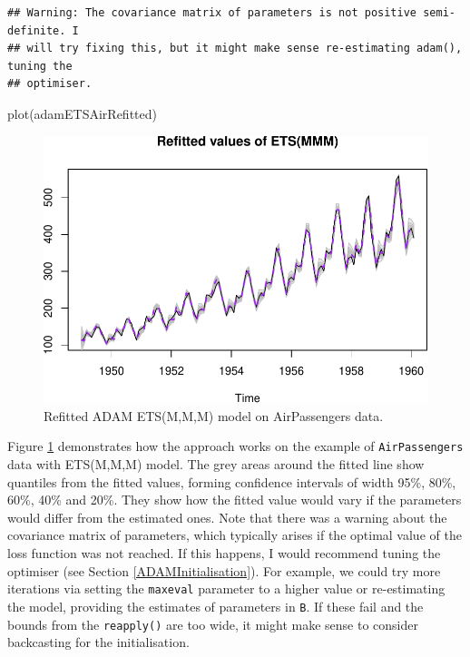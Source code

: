 \documentclass[
]{book}
\newenvironment{Shaded}{\begin{snugshade}}{\end{snugshade}}
\newcommand{\FunctionTok}[1]{\textcolor[rgb]{0.00,0.00,0.00}{#1}}
\newcommand{\NormalTok}[1]{#1}
\theoremstyle{definition}
\theoremstyle{definition}
\theoremstyle{definition}
\theoremstyle{definition}
\theoremstyle{remark}
\begin{document}
\begin{verbatim}
## Warning: The covariance matrix of parameters is not positive semi-definite. I
## will try fixing this, but it might make sense re-estimating adam(), tuning the
## optimiser.
\end{verbatim}

\begin{Shaded}
\begin{Highlighting}[]
\FunctionTok{plot}\NormalTok{(adamETSAirRefitted)}
\end{Highlighting}
\end{Shaded}

\begin{figure}
\centering
\includegraphics{Svetunkov--2022----ADAM_files/figure-latex/adamETSRefitted-1.pdf}
\caption{\label{fig:adamETSRefitted}Refitted ADAM ETS(M,M,M) model on AirPassengers data.}
\end{figure}

Figure \ref{fig:adamETSRefitted} demonstrates how the approach works on the example of \texttt{AirPassengers} data with ETS(M,M,M) model. The grey areas around the fitted line show quantiles from the fitted values, forming confidence intervals of width 95\%, 80\%, 60\%, 40\% and 20\%. They show how the fitted value would vary if the parameters would differ from the estimated ones. Note that there was a warning about the covariance matrix of parameters, which typically arises if the optimal value of the loss function was not reached. If this happens, I would recommend tuning the optimiser (see Section \ref{ADAMInitialisation}). For example, we could try more iterations via setting the \texttt{maxeval} parameter to a higher value or re-estimating the model, providing the estimates of parameters in \texttt{B}. If these fail and the bounds from the \texttt{reapply()} are too wide, it might make sense to consider backcasting for the initialisation.
\end{document}
